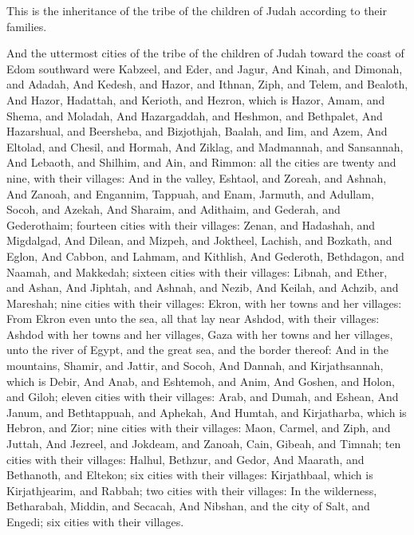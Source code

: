\verse This is the inheritance of the tribe of the children of Judah according to their families.

\verse And the uttermost cities of the tribe of the children of Judah toward the coast of Edom southward were Kabzeel, and Eder, and Jagur, \verse And Kinah, and Dimonah, and Adadah, \verse And Kedesh, and Hazor, and Ithnan, \verse Ziph, and Telem, and Bealoth, \verse And Hazor, Hadattah, and Kerioth, and Hezron, which is Hazor, \verse Amam, and Shema, and Moladah, \verse And Hazargaddah, and Heshmon, and Bethpalet, \verse And Hazarshual, and Beersheba, and Bizjothjah, \verse Baalah, and Iim, and Azem, \verse And Eltolad, and Chesil, and Hormah, \verse And Ziklag, and Madmannah, and Sansannah, \verse And Lebaoth, and Shilhim, and Ain, and Rimmon: all the cities are twenty and nine, with their villages: \verse And in the valley, Eshtaol, and Zoreah, and Ashnah, \verse And Zanoah, and Engannim, Tappuah, and Enam, \verse Jarmuth, and Adullam, Socoh, and Azekah, \verse And Sharaim, and Adithaim, and Gederah, and Gederothaim; fourteen cities with their villages: \verse Zenan, and Hadashah, and Migdalgad, \verse And Dilean, and Mizpeh, and Joktheel, \verse Lachish, and Bozkath, and Eglon, \verse And Cabbon, and Lahmam, and Kithlish, \verse And Gederoth, Bethdagon, and Naamah, and Makkedah; sixteen cities with their villages: \verse Libnah, and Ether, and Ashan, \verse And Jiphtah, and Ashnah, and Nezib, \verse And Keilah, and Achzib, and Mareshah; nine cities with their villages: \verse Ekron, with her towns and her villages: \verse From Ekron even unto the sea, all that lay near Ashdod, with their villages: \verse Ashdod with her towns and her villages, Gaza with her towns and her villages, unto the river of Egypt, and the great sea, and the border thereof: \verse And in the mountains, Shamir, and Jattir, and Socoh, \verse And Dannah, and Kirjathsannah, which is Debir, \verse And Anab, and Eshtemoh, and Anim, \verse And Goshen, and Holon, and Giloh; eleven cities with their villages: \verse Arab, and Dumah, and Eshean, \verse And Janum, and Bethtappuah, and Aphekah, \verse And Humtah, and Kirjatharba, which is Hebron, and Zior; nine cities with their villages: \verse Maon, Carmel, and Ziph, and Juttah, \verse And Jezreel, and Jokdeam, and Zanoah, \verse Cain, Gibeah, and Timnah; ten cities with their villages: \verse Halhul, Bethzur, and Gedor, \verse And Maarath, and Bethanoth, and Eltekon; six cities with their villages: \verse Kirjathbaal, which is Kirjathjearim, and Rabbah; two cities with their villages: \verse In the wilderness, Betharabah, Middin, and Secacah, \verse And Nibshan, and the city of Salt, and Engedi; six cities with their villages.

